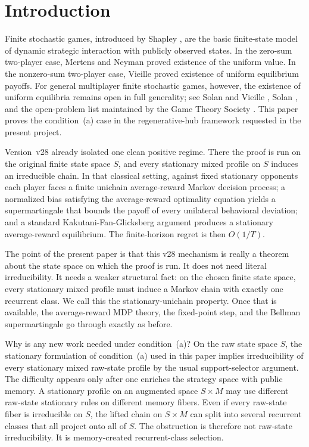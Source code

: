 \documentclass[11pt]{article}
\theoremstyle{definition}
\newcommand{\1}{\mathbf{1}}
\begin{document}
\section{Introduction}

Finite stochastic games, introduced by Shapley \cite{Shapley1953}, are the basic finite-state model of dynamic strategic interaction with publicly observed states. In the zero-sum two-player case, Mertens and Neyman \cite{MertensNeyman1981} proved existence of the uniform value. In the nonzero-sum two-player case, Vieille \cite{Vieille2000a,Vieille2000b} proved existence of uniform equilibrium payoffs. For general multiplayer finite stochastic games, however, the existence of uniform equilibria remains open in full generality; see Solan and Vieille \cite{SolanVieille2015}, Solan \cite{Solan2022}, and the open-problem list maintained by the Game Theory Society \cite{OpenProblems2026}. This paper proves the condition~(a) case in the regenerative-hub framework requested in the present project.

Version~v28 already isolated one clean positive regime. There the proof is run on the original finite state space $S$, and every stationary mixed profile on $S$ induces an irreducible chain. In that classical setting, against fixed stationary opponents each player faces a finite unichain average-reward Markov decision process; a normalized bias satisfying the average-reward optimality equation yields a supermartingale that bounds the payoff of every unilateral behavioral deviation; and a standard Kakutani-Fan-Glicksberg argument produces a stationary average-reward equilibrium. The finite-horizon regret is then $O(1/T)$.

The point of the present paper is that this v28 mechanism is really a theorem about the state space on which the proof is run. It does not need literal irreducibility. It needs a weaker structural fact: on the chosen finite state space, every stationary mixed profile must induce a Markov chain with exactly one recurrent class. We call this the stationary-unichain property. Once that is available, the average-reward MDP theory, the fixed-point step, and the Bellman supermartingale go through exactly as before.

Why is any new work needed under condition~(a)? On the raw state space $S$, the stationary formulation of condition~(a) used in this paper implies irreducibility of every stationary mixed raw-state profile by the usual support-selector argument. The difficulty appears only after one enriches the strategy space with public memory. A stationary profile on an augmented space $S\times M$ may use different raw-state stationary rules on different memory fibers. Even if every raw-state fiber is irreducible on $S$, the lifted chain on $S\times M$ can split into several recurrent classes that all project onto all of $S$. The obstruction is therefore not raw-state irreducibility. It is memory-created recurrent-class selection.
\end{document}
